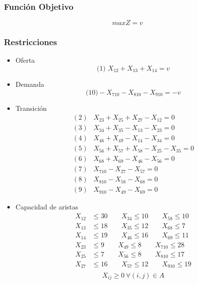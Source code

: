 \documentclass[a4paper,12pt]{article}
\begin{document}
\subsubsection{Función Objetivo}
\begin{equation*}
	maxZ = v
\end{equation*}

\subsubsection{Restricciones}
\begin{itemize}
	\item Oferta
		\begin{equation*}
		\text{(1) }	X_{12}+X_{13}+X_{14}=v	
		\end{equation*}
	\item Demanda
		\begin{equation*}
		\text{(10)}	-X_{710}-X_{810}-X_{910}=-v
		\end{equation*}
	\item Transición
		\begin{equation*}
		\begin{split}
			(2)&X_{23}+X_{25}+X_{27}-X_{12}=0\\
			(3)&X_{34}+X_{35}-X_{13}-X_{23}=0\\
			(4)&X_{46}+X_{49}-X_{14}-X_{34}=0\\
			(5)&X_{56}+X_{57}+X_{58}-X_{25}-X_{35}=0\\
			(6)&X_{68}+X_{69}-X_{46}-X_{56}=0\\
			(7)&X_{710}-X_{27}-X_{57}=0\\
			(8)&X_{810}-X_{58}-X_{68}=0\\
			(9)&X_{910}-X_{49}-X_{69}=0
		\end{split}
		\end{equation*}
		\item Capacidad de aristas
		\begin{equation*}
		\begin{split}
			X_{12}&\leq 30 \qquad X_{34}\leq 10 \qquad X_{58}\leq 10\\
			X_{13}&\leq 18 \qquad X_{35}\leq 12 \qquad X_{68}\leq 7\\
			X_{14}&\leq 19 \qquad X_{46}\leq 16 \qquad X_{69}\leq 11\\
			X_{23}&\leq 9 \qquad X_{49}\leq 8 \qquad X_{710}\leq 28\\
			X_{25}&\leq 7 \qquad X_{56}\leq 8 \qquad X_{810}\leq 17\\
			X_{27}&\leq 16 \qquad X_{57}\leq 12 \qquad X_{910}\leq 19\\
		\end{split}
		\end{equation*}
		\begin{equation*}
			X_{ij}\geq 0\ \forall(i,j)\in A
		\end{equation*}
\end{itemize}
\end{document}
